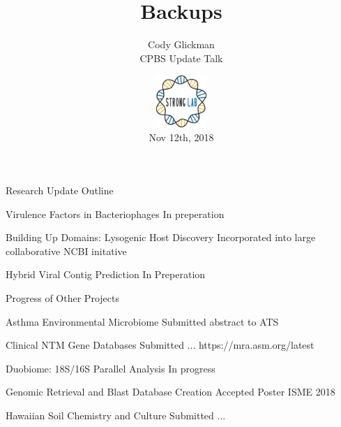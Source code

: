 \documentclass[11pt, xcolor=table]{beamer}
\author{Cody Glickman  \\ CPBS Update Talk}
\title{Backups}
\date{ \includegraphics[height=2cm, width=2cm]{lablogo.png} \\ Nov 12th, 2018}
\begin{document}
	\maketitle

	\begin{frame}{Research Update Outline}
	\begin{block}{Virulence Factors in Bacteriophages}
	In preperation
	\end{block}
	
	\begin{block}{Building Up Domains: Lysogenic Host Discovery}
	Incorporated into large collaborative NCBI initative
	\end{block}

	\begin{block}{Hybrid Viral Contig Prediction}
	In Preperation
	\end{block}
	\end{frame}
	\begin{frame}{Progress of Other Projects}
	\begin{block}{Asthma Environmental Microbiome}
	Submitted abstract to ATS
	\end{block}
	
		
	\begin{block}{Clinical NTM Gene Databases}
	Submitted ...
	https://mra.asm.org/latest 
	\end{block}
	
	\begin{block}{Duobiome: 18S/16S Parallel Analysis}
	In progress
	\end{block}
	
	
	\begin{block}{Genomic Retrieval and Blast Database Creation}
	Accepted Poster ISME 2018
	\end{block}
	
	\begin{block}{Hawaiian Soil Chemistry and Culture}
	Submitted ...
	\end{block}
	

	\end{frame}
\section{}
\end{document}
